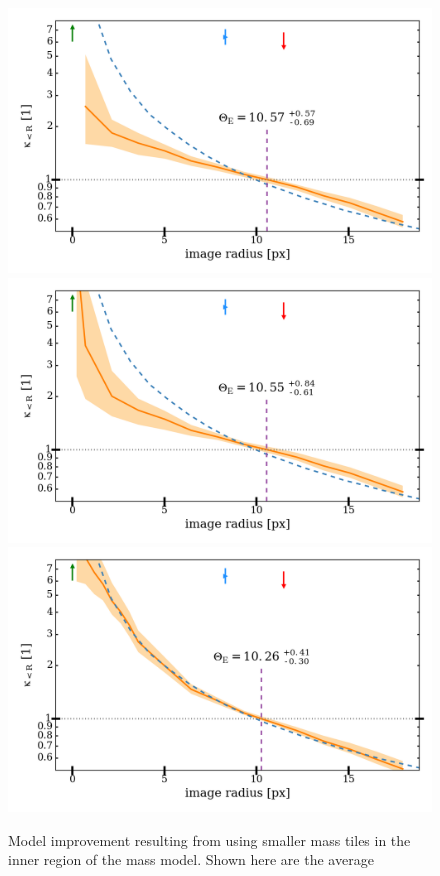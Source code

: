 \documentclass[fleqn,usenatbib]{mnras}
\begin{document}
\begin{figure}
  \includegraphics[width=.9\linewidth]{img/hires_comparison/ASW000102p_6941_11_hires_comparison}
  \includegraphics[width=.9\linewidth]{img/hires_comparison/ASW000102p_6941_13_hires_comparison}
  \includegraphics[width=.9\linewidth]{img/hires_comparison/ASW000102p_6941_33_hires_comparison}
  \caption{Model improvement resulting from using smaller mass tiles
    in the inner region of the mass model.  Shown here are the average
}
\end{figure}
\end{document}

